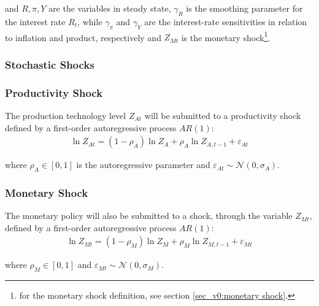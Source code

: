 \documentclass[../thesis.tex]{subfiles}
\begin{document}
	and $R, \pi, Y$ are the variables in steady state, $\gamma_R$ is the smoothing parameter for the interest rate $R_t$, while $\gamma_\pi$ and $\gamma_Y$ are the interest-rate sensitivities in relation to inflation and product, respectively and $Z_{Mt}$ is the monetary shock\footnote{for the monetary shock definition, see section \ref{sec_v0:monetary shock}.}.
	
	
	\subsubsection{Stochastic Shocks}\label{sec_v0:stochastic-shocks}
	
	\subsubsection*{Productivity Shock} \label{sec_v0:productivity shock}
	
	The production technology level $Z_{At}$ will be submitted to a productivity shock defined by a first-order autoregressive process $AR(1)$:
	\begin{align}
		\ln{Z_{At}} = (1-\rho_A)\ln{Z_A} + \rho_A\ln{Z_{A,t-1}} + \varepsilon_{At} \label{eq_v0:productivity-shock}
	\end{align}
	
	where $\rho_A \in [0,1]$ is the autoregressive parameter and $\varepsilon_{At} \sim \mathscr{N}(0,\sigma_A)$.
	
	\subsubsection*{Monetary Shock} \label{sec_v0:monetary shock}
	
	The monetary policy will also be submitted to a shock, through the variable $Z_{Mt}$, defined by a first-order autoregressive process $AR(1)$:
	\begin{align}
		\ln{Z_{Mt}} = (1-\rho_M)\ln{Z_{M}} + \rho_M\ln{Z_{M,t-1}} + \varepsilon_{Mt} \label{eq_v0:monetary-shock}
	\end{align}
	
	where $\rho_M \in [0,1]$ and $\varepsilon_{Mt} \sim \mathscr{N}(0,\sigma_M)$.
	
	
\end{document}
